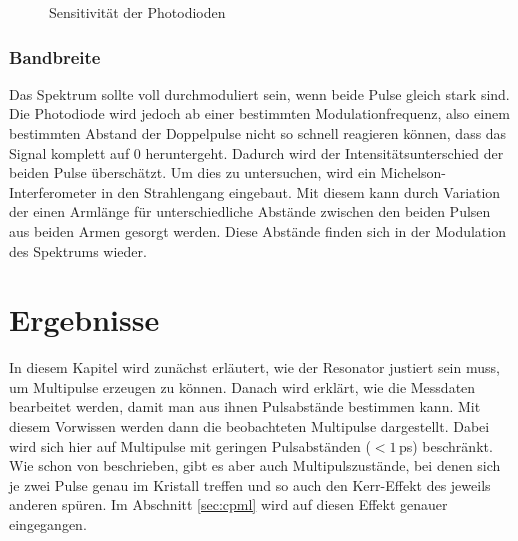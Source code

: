 \documentclass[bachelor,       %
               twoside,        %
               BCOR10mm,       %
               english,ngerman, %
               ]{GAUBM}
\begin{document}
\begin{figure}[!htb]
	\centering
   \hfill
	\caption{Sensitivität der Photodioden}
	\label{fig:PDsens}
\end{figure}


\subsection{Bandbreite}
Das Spektrum sollte voll durchmoduliert sein, wenn beide Pulse gleich stark sind.
Die Photodiode wird jedoch ab einer bestimmten Modulationfrequenz, also einem bestimmten Abstand der Doppelpulse nicht so schnell reagieren können, dass das Signal komplett auf 0 heruntergeht.
Dadurch wird der Intensitätsunterschied der beiden Pulse überschätzt.
Um dies zu untersuchen, wird ein Michelson-Interferometer in den Strahlengang eingebaut.
Mit diesem kann durch Variation der einen Armlänge für unterschiedliche Abstände zwischen den beiden Pulsen aus beiden Armen gesorgt werden.
Diese Abstände finden sich in der Modulation des Spektrums wieder.

\chapter{Ergebnisse}
In diesem Kapitel wird zunächst erläutert, wie der Resonator justiert sein muss, um Multipulse erzeugen zu können.
Danach wird erklärt, wie die Messdaten bearbeitet werden, damit man aus ihnen Pulsabstände bestimmen kann.
Mit diesem Vorwissen werden dann die beobachteten Multipulse dargestellt.
Dabei wird sich hier auf Multipulse mit geringen Pulsabständen ($< 1\,$ps) beschränkt.
Wie schon von \cite{lai_multiple_1997} beschrieben, gibt es aber auch Multipulszustände, bei denen sich je zwei Pulse genau im Kristall treffen und so auch den Kerr-Effekt des jeweils anderen spüren.
Im Abschnitt \ref{sec:cpml} wird auf diesen Effekt genauer eingegangen.
\end{document}
